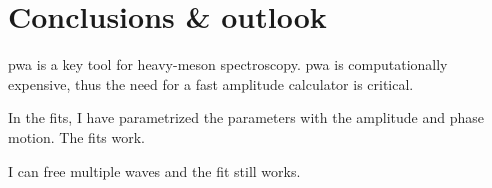 \chapter{Conclusions \& outlook}

    \ac{pwa} is a key tool for heavy-meson spectroscopy.
    \ac{pwa} is computationally expensive, thus the need for a fast amplitude calculator is critical.


    In the fits, I have parametrized the parameters with the amplitude and phase motion.
    The fits work.


    I can free multiple waves and the fit still works.
